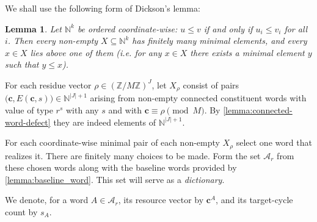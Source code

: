\documentclass[DIV=12,10pt]{scrartcl}
\newtheorem{lemma}{Lemma}
\theoremstyle{definition}
\newcommand{\cvec}{\mathbf{c}}
\newcommand{\dict}{\mathcal{A}}
\begin{document}
We shall use the following form of Dickson's lemma:
\begin{lemma}
	\label{lemma:dickson}
	Let $\mathbb{N}^k$ be ordered coordinate-wise: $u\leqslant v$ if and only if $u_i\leqslant v_i$ for all $i$. Then every non-empty $X\subseteq \mathbb{N}^k$ has finitely many minimal elements, and every $x\in X$ lies above one of them (i.e. for any $x\in X$ there exists a minimal element $y$ such that $y\leqslant x$).
\end{lemma}

For each residue vector $\rho \in(\mathbb{Z}/M\mathbb{Z})^J$, let $X_\rho$ consist of pairs $\big( \cvec, E(\cvec,s) \big) \in \mathbb{N}^{|J|+1}$ arising from non-empty connected constituent words with value of type $r^s$ with any $s$ and with $\cvec \equiv \rho \pmod{M}$. By \cref{lemma:connected-word-defect} they are indeed elements of $\mathbb{N}^{|J|+1}$.

For each coordinate-wise minimal pair of each non-empty $X_\rho$ select one word that realizes it. There are finitely many choices to be made. Form the set $\dict_r$ from these chosen words along with the baseline words provided by \cref{lemma:baseline_word}. This set will serve as a \emph{dictionary}.

We denote, for a word $A\in\dict_r$, its resource vector by $\cvec^A$, and its target-cycle count by $s_A$.
\end{document}
